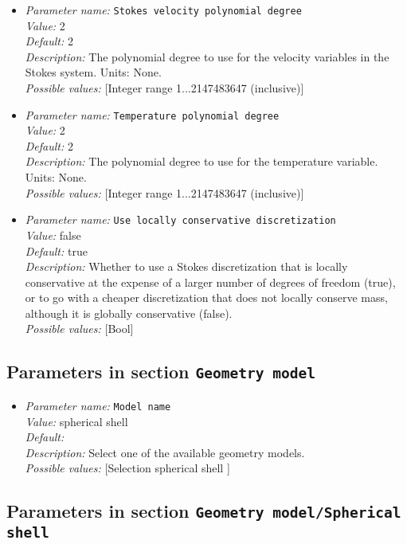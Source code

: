 \begin{itemize}
\item {\it Parameter name:} {\tt Stokes velocity polynomial degree}\\
{\it Value:} 2\\
{\it Default:} 2\\
{\it Description:} The polynomial degree to use for the velocity variables in the Stokes system. Units: None.\\
{\it Possible values:} [Integer range 1...2147483647 (inclusive)]
\item {\it Parameter name:} {\tt Temperature polynomial degree}\\
{\it Value:} 2\\
{\it Default:} 2\\
{\it Description:} The polynomial degree to use for the temperature variable. Units: None.\\
{\it Possible values:} [Integer range 1...2147483647 (inclusive)]
\item {\it Parameter name:} {\tt Use locally conservative discretization}\\
{\it Value:} false\\
{\it Default:} true\\
{\it Description:} Whether to use a Stokes discretization that is locally conservative at the expense of a larger number of degrees of freedom (true), or to go with a cheaper discretization that does not locally conserve mass, although it is globally conservative (false).\\
{\it Possible values:} [Bool]
\end{itemize}

\subsection{Parameters in section \tt Geometry model}

\begin{itemize}
\item {\it Parameter name:} {\tt Model name}\\
{\it Value:} spherical shell\\
{\it Default:} \\
{\it Description:} Select one of the available geometry models.\\
{\it Possible values:} [Selection spherical shell ]
\end{itemize}



\subsection{Parameters in section \tt Geometry model/Spherical shell}

